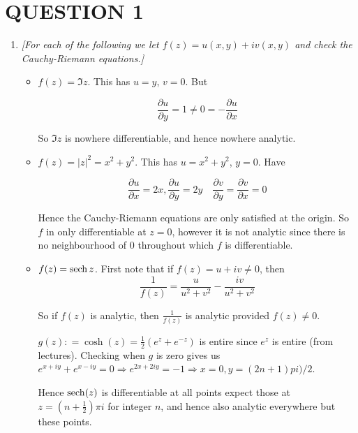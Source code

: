 \documentclass[a4paper]{article}
\begin{document}
	
\maketitle

\section{QUESTION 1}

\begin{enumerate}
	\item \emph{[For each of the following we let $ f(z) = u(x,y) + iv(x,y) $ and check the Cauchy-Riemann equations.] }
	
	\begin{itemize}
		\item $ f(z) = \Im z$. This has $ u = y $, $ v = 0 $. But
		
		\[ \frac{\partial u }{\partial y} = 1 \neq 0 = - \frac{\partial u }{\partial x} \]
		
		So $ \Im z $ is nowhere differentiable, and hence nowhere analytic.
		
		\item $ f(z) = | z |^{2} = x^{2} + y^{2} $. This has $ u = x^{2} + y^{2} $, $ y = 0 $. Have
		
		\[ \frac{\partial u }{\partial x} = 2x, \frac{\partial u }{\partial y} = 2y \quad \frac{\partial v }{\partial y} = \frac{\partial v }{\partial x} = 0  \]
		
		Hence the Cauchy-Riemann equations are only satisfied at the origin. So $ f $ in only differentiable at $ z = 0 $, however it is not analytic since there is no neighbourhood of 0 throughout which $ f $ is differentiable.
		
		\item $ f(z) = \operatorname{sech} z $. First note that if $ f(z) = u + iv \neq 0 $, then \[ \frac{1}{f(z)} = \frac{u}{u^{2} + v^{2}} - \frac{iv}{u^{2} + v^{2}} \] 
		
		So if $ f(z) $ is analytic, then $ \frac{1}{f(z)} $ is analytic provided $ f(z) \neq 0 $. 
		
		
		$ g(z) : = \cosh(z) = \frac{1}{2} (e^{z} + e^{-z}) $ is entire since $ e^{z} $ is entire (from lectures). Checking when $ g $ is zero gives us $ e^{x + iy} + e^{x - i y} = 0 \Rightarrow e^{2x + 2iy} = -1 \Rightarrow x = 0, y = (2n +1)pi)/2$.
		
		Hence $ \operatorname{sech} (z) $ is differentiable at all points expect those at $ z = (n + \frac{1}{2}) \pi i $ for integer $ n $, and hence also analytic everywhere but these points. 
	\end{itemize}
	

\end{enumerate}
\end{document}
